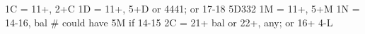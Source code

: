 1C = 11+, 2+C
1D = 11+, 5+D or 4441; or 17-18 5D332
1M = 11+, 5+M
1N = 14-16, bal  # could have 5M if 14-15
2C = 21+ bal or 22+, any; or 16+ 4-L